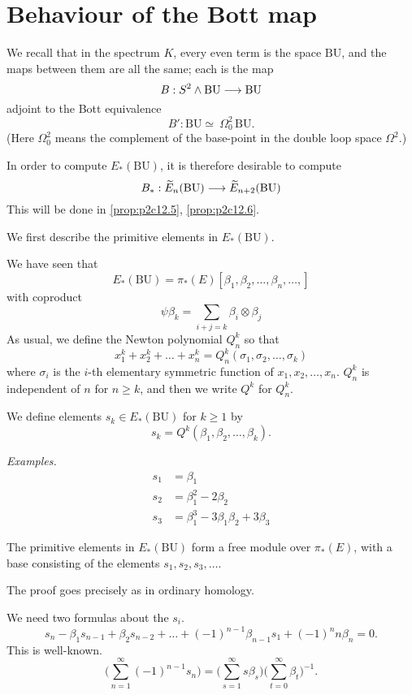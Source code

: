 \documentclass[../main]{subfiles}
\begin{document}
\label{sec:p2c12}

\chapter{Behaviour of the Bott map}
We recall that in the spectrum $K$, every even term is the space $\mathrm{BU}$, and the maps between them are all the same; each is the map \[B:S^2\wedge \mathrm{BU} \longrightarrow  \mathrm{BU}\] adjoint to the Bott equivalence \[B':\mathrm{BU}\simeq\:\Omega^2_0\,\mathrm{BU}.\]%
(Here $\Omega^2_0$ means the complement of the base-point in the double loop space $\Omega^2$.)

In order to compute $E_\ast(\mathrm{BU})$, it is therefore desirable to compute \[B_\ast:\widetilde{E}_n(\mathrm{BU}) \longrightarrow \widetilde{E}_{n+2}( \mathrm{BU})\]
This will be done in \eqref{prop:p2c12.5}, \eqref{prop:p2c12.6}.

We first describe the primitive elements in $E_\ast(\mathrm{BU})$.

We have seen that \[E_\ast(\mathrm{BU}) = \pi_\ast(E)[\beta_1, \beta_2, \dots, \beta_n, \dots,]\] with coproduct
\[\psi\beta_k = \sum_{i+j=k}\beta_i\otimes\beta_j\]
As usual, we define the Newton polynomial $Q_n^k$ so that \[x_1^k + x_2^k + \dots + x_n^k = Q^k_n(\sigma_1, \sigma_2, \dots, \sigma_k)\] where $\sigma_i$ is the $i$-th elementary symmetric function of $x_1, x_2, \dots, x_n$. $Q_n^k$ is independent of $n$ for $n\ge k$, and then we write $Q^k$ for $Q_n^k$.

We define elements $s_k \in E_\ast(\mathrm{BU})$ for $k\ge 1$ by \[s_k = Q^k(\beta_1, \beta_2, \dots, \beta_k).\]

\emph{Examples.}
\begin{align*}
s_1 &= \beta_1\\
s_2 &= \beta_1^2 - 2\beta_2\\
s_3 &= \beta_1^3 - 3\beta_1\beta_2 + 3\beta_3
\end{align*}

\begin{customprop}{12.1}
\label{prop:p2c12.1}
The primitive elements in $E_\ast( \mathrm{BU})$ form a free module over $\pi_\ast(E)$, with a base consisting of the elements $s_1, s_2, s_3, \dots$.

The proof goes precisely as in ordinary homology. 

We need two formulas about the $s_i$.
\begin{equation}
\label{eqn:p2c12.2}
\tag{12.2}
s_n - \beta_1 s_{n-1} + \beta_2 s_{n-2} + \dots + (-1)^{n-1}\beta_{n-1} s_1 + (-1)^n n\beta_n = 0.
\end{equation}
This is well-known.
\begin{equation}
\label{eqn:p2c12.3}
\tag{12.3}
\bigg(\sum^\infty_{n=1} (-1)^{n-1}s_n\bigg) = \bigg(\sum^\infty_{s=1}s\beta_s\bigg)\bigg(\sum^\infty_{t=0}\beta_t\bigg)^{-1}.
\end{equation}
\end{customprop}
\end{document}
